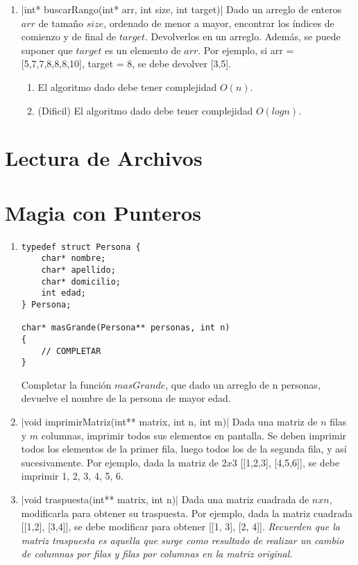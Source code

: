 \documentclass[titlepage,oneside]{book}
\begin{document}
\begin{enumerate}
        
    \item{}|int* buscarRango(int* arr, int size, int target)|
    Dado un arreglo de enteros $arr$ de tamaño $size$, ordenado de menor a mayor, encontrar los índices de comienzo y de final de $target$. Devolverlos en un arreglo. Además, se puede suponer que $target$ es un elemento de $arr$.
    \newline
    Por ejemplo, si arr = [5,7,7,8,8,8,10], target = 8, se debe devolver [3,5].
    \begin{enumerate}
        \item El algoritmo dado debe tener complejidad $O(n)$.
        \item (Dificil) El algoritmo dado debe tener complejidad $O(log{}n)$.\newline
    \end{enumerate}

        
        
    \end{enumerate}
    

\chapter{Lectura de Archivos}

\chapter{Magia con Punteros}

\begin{enumerate}

    \item\begin{verbatim}
typedef struct Persona {
    char* nombre;
    char* apellido;
    char* domicilio;
    int edad;
} Persona;

char* masGrande(Persona** personas, int n)
{
    // COMPLETAR
}
    \end{verbatim}

    Completar la función $masGrande$, que dado un arreglo de n personas, devuelve el nombre de la persona de mayor edad.

    \item {}|void imprimirMatriz(int** matrix, int n, int m)|
    Dada una matriz de $n$ filas y $m$ columnas, imprimir todos sus elementos en pantalla. Se deben imprimir todos los elementos de la primer fila, luego todos los de la segunda fila, y así sucesivamente. Por ejemplo, dada la matriz de $2x3$ [[1,2,3], [4,5,6]], se debe imprimir 1, 2, 3, 4, 5, 6.
    
    \item {}|void traspuesta(int** matrix, int n)|
    Dada una matriz cuadrada de $nxn$, modificarla para obtener su traspuesta. Por ejemplo, dada la matriz cuadrada [[1,2], [3,4]], se debe modificar para obtener [[1, 3], [2, 4]]. \textit{Recuerden que la matriz traspuesta es aquella que surge como resultado de realizar un cambio de columnas por filas y filas por columnas en la matriz original.}
    
\end{enumerate}
\end{document}
